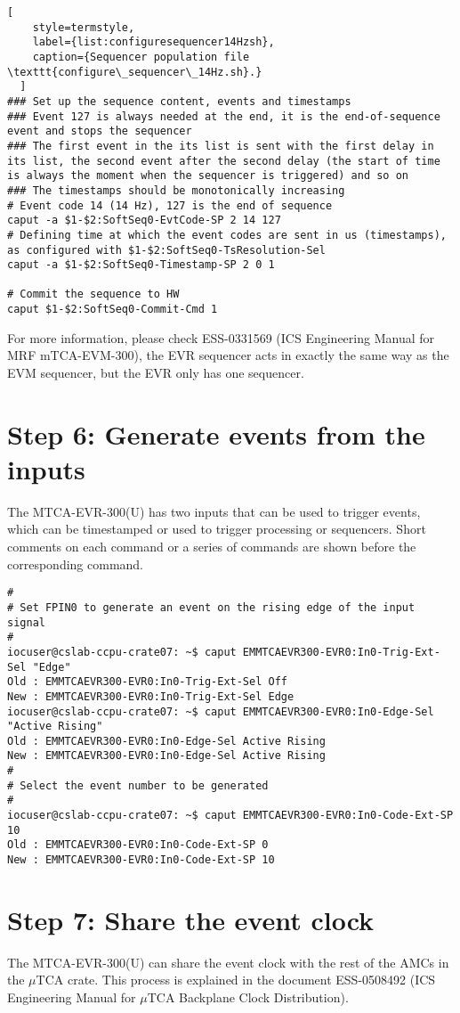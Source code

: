 \documentclass[11pt
  , a4paper
  , article
  , oneside
  , showtrims
]{memoir}
\begin{document}
{\begin{lstlisting}[
    style=termstyle,
    label={list:configuresequencer14Hzsh},
    caption={Sequencer population file \texttt{configure\_sequencer\_14Hz.sh}.}
  ]
### Set up the sequence content, events and timestamps
### Event 127 is always needed at the end, it is the end-of-sequence event and stops the sequencer
### The first event in the its list is sent with the first delay in its list, the second event after the second delay (the start of time is always the moment when the sequencer is triggered) and so on
### The timestamps should be monotonically increasing
# Event code 14 (14 Hz), 127 is the end of sequence
caput -a $1-$2:SoftSeq0-EvtCode-SP 2 14 127
# Defining time at which the event codes are sent in us (timestamps), as configured with $1-$2:SoftSeq0-TsResolution-Sel
caput -a $1-$2:SoftSeq0-Timestamp-SP 2 0 1

# Commit the sequence to HW
caput $1-$2:SoftSeq0-Commit-Cmd 1
\end{lstlisting}

For more information, please check ESS-0331569 (ICS Engineering Manual for MRF mTCA-EVM-300), the EVR sequencer acts in exactly the same way as the EVM sequencer, but the EVR only has one sequencer.\\


\section{Step 6: Generate events from the inputs}
The MTCA-EVR-300(U) has two inputs that can be used to trigger events, which can be timestamped or used to trigger processing or sequencers. Short comments on each command or a series of commands are shown before the corresponding command.
\begin{lstlisting}[style=termstyle]
#
# Set FPIN0 to generate an event on the rising edge of the input signal
#
iocuser@cslab-ccpu-crate07: ~$ caput EMMTCAEVR300-EVR0:In0-Trig-Ext-Sel "Edge"
Old : EMMTCAEVR300-EVR0:In0-Trig-Ext-Sel Off
New : EMMTCAEVR300-EVR0:In0-Trig-Ext-Sel Edge
iocuser@cslab-ccpu-crate07: ~$ caput EMMTCAEVR300-EVR0:In0-Edge-Sel "Active Rising"
Old : EMMTCAEVR300-EVR0:In0-Edge-Sel Active Rising
New : EMMTCAEVR300-EVR0:In0-Edge-Sel Active Rising
#
# Select the event number to be generated
#
iocuser@cslab-ccpu-crate07: ~$ caput EMMTCAEVR300-EVR0:In0-Code-Ext-SP 10
Old : EMMTCAEVR300-EVR0:In0-Code-Ext-SP 0
New : EMMTCAEVR300-EVR0:In0-Code-Ext-SP 10
\end{lstlisting}


\section{Step 7: Share the event clock}
The MTCA-EVR-300(U) can share the event clock with the rest of the AMCs in the $\mu$TCA crate. This process is explained in the document ESS-0508492 (ICS Engineering Manual for $\mu$TCA Backplane Clock Distribution).



}
\end{document}
